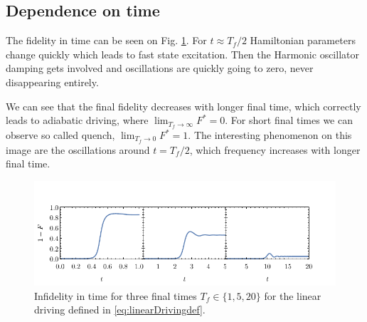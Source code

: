 \subsection{Dependence on time}
The fidelity in time can be seen on Fig. \ref{fig:infidelityTimePlotLin}. For $t\approx T_f/2$ Hamiltonian parameters change quickly which leads to fast state excitation. Then the Harmonic oscillator damping gets involved and oscillations are quickly going to zero, never disappearing entirely.

We can see that the final fidelity decreases with longer final time, which correctly leads to adiabatic driving, where $\lim_{T_f\rightarrow \infty} F^*=0$. For short final times we can observe so called quench, $\lim_{T_f\rightarrow 0} F^*=1$. The interesting phenomenon on this image are the oscillations around $t=T_f/2$, which frequency increases with longer final time. 

\begin{figure}[H]
    \centering 
    \includegraphics[scale=1.185]{../img/infidelityInTimePlot1.pdf}
    \caption{Infidelity in time for three final times $T_f\in\{1,5,20\}$ for the linear driving defined in \ref{eq:linearDrivingdef}.}
  \label{fig:infidelityTimePlotLin}
\end{figure}


